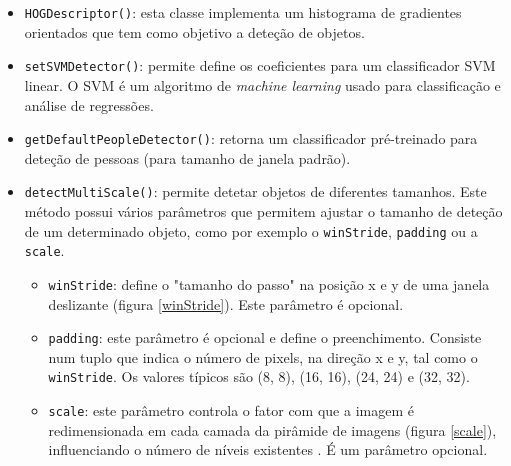\begin{itemize}
	\item \texttt{HOGDescriptor()}: esta classe implementa um histograma de gradientes orientados\cite{Dalal} que tem como objetivo a deteção de objetos.
	
	\item \texttt{setSVMDetector()}: permite define os coeficientes para um  classificador \ac{SVM} linear. O \ac{SVM} é um algoritmo de \textit{machine learning} usado para classificação e análise de regressões. 
	
	
	\item \texttt{getDefaultPeopleDetector()}: retorna um classificador pré-treinado para deteção de pessoas (para tamanho de janela padrão)\cite{featuredetection}. 
	
	
	\item \texttt{detectMultiScale()}: permite detetar objetos de diferentes tamanhos. Este método possui vários parâmetros que permitem ajustar o tamanho de deteção de um determinado objeto, como por exemplo o \texttt{winStride}, \texttt{padding} ou a \texttt{scale}. 
	
\begin{itemize}
	\item \texttt{winStride}: define o "tamanho do passo" na posição x e y de uma janela deslizante (figura \ref{winStride}). Este parâmetro é opcional.
	 
	\item \texttt{padding}: este parâmetro é opcional e define o preenchimento. Consiste num tuplo que indica o número de pixels, na direção x e y, tal como o \texttt{winStride}. Os valores típicos são (8, 8),  (16, 16), (24, 24) e (32, 32).
	
	\item \texttt{scale}: este parâmetro controla o fator com que a imagem é redimensionada em cada camada da pirâmide de imagens (figura \ref{scale}), influenciando o número de níveis existentes . É um parâmetro opcional. 

\end{itemize}
	
	 
\end{itemize}


